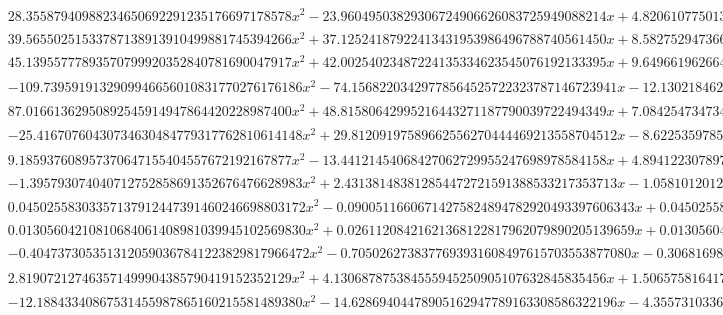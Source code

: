 \documentclass{article}
\begin{document}
\begin{landscape}
\begin{eqnarray*}
\begin{array}{cc}
\begin{array}{cc}
 28.35587940988234650692291235176697178578 x^2-23.96049503829306724906626083725949088214 x+4.820610775013387646649219223410242434209 & x\geq \frac{7}{16}\land x<\frac{1}{2} \\
 39.56550251533787138913910499881745394266 x^2+37.12524187922413431953986496788740561450 x+8.582752947366905367624987700332821983450 & x\geq -\frac{1}{2}\land x<-\frac{7}{16} \\
 45.13955777893570799920352840781690047917 x^2+42.00254023487224135334623545076192133395 x+9.649661962664928781270131243461622297079 & x\geq -\frac{7}{16}\land x<-\frac{3}{8} \\
 -109.7395919132909946656010831770276176186 x^2-74.15682203429778564525722323787146723941 x-12.13021846280445128096801726065713806043 & x\geq -\frac{3}{8}\land x<-\frac{5}{16} \\
 87.01661362950892545914947864420228987400 x^2+48.81580642995216443271187790039722494349 x+7.084254734734603418714654792197345093152 & x\geq -\frac{5}{16}\land x<-\frac{1}{4} \\
 -25.41670760430734630484779317762810614148 x^2+29.81209197589662556270444469213558704512 x-8.622535978534035556293457158938527047606 & x\geq \frac{1}{2}\land x<\frac{5}{8} \\
 9.185937608957370647155404557672192167877 x^2-13.44121454068427062729955247698978584158 x+4.894122307897494503082791956413151979488 & x\geq \frac{5}{8}\land x<\frac{3}{4} \\
 -1.395793074040712752858691352676476628983 x^2+2.431381483812854472721591388533217353713 x-1.058101201288927409425136993157974218745 & x\geq \frac{3}{4}\land x<\frac{7}{8} \\
 0.04502558303357137912447391460246698803172 x^2-0.09005116606714275824894782920493397606343 x+0.04502558303357137912447391460246698803172 & x\geq \frac{7}{8}\land x<1 \\
 0.01305604210810684061408981039945102569830 x^2+0.02611208421621368122817962079890205139659 x+0.01305604210810684061408981039945102569830 & x\geq -1\land x<-\frac{7}{8} \\
 -0.4047373053513120590367841223829817966472 x^2-0.7050262738377693931608497615703553877080 x-0.3068169895405107544311105443870991039100 & x\geq -\frac{7}{8}\land x<-\frac{3}{4} \\
 2.819072127463571499904385790419152352129 x^2+4.130687875384555945250905107632845835456 x+1.506575816417861247473297531564101354777 & x\geq -\frac{3}{4}\land x<-\frac{5}{8} \\
 -12.18843340867531455987865160215581489380 x^2-14.62869404478905162947789163308586322196 x-4.355731033636391119629451449910495225666 & x\geq -\frac{5}{8}\land x<-\frac{1}{2}
\end{array}


\end{array}
\end{eqnarray*}
\end{landscape}
\end{document}
